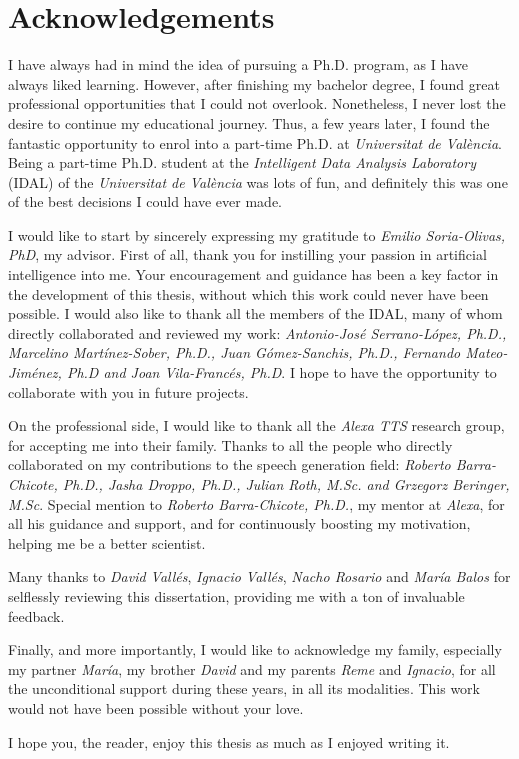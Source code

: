 \chapter*{Acknowledgements}

I have always had in mind the idea of pursuing a Ph.D. program, as I have always liked learning. However, after finishing my bachelor degree, I found great professional opportunities that I could not overlook. Nonetheless, I never lost the desire to continue my educational journey.  Thus, a  few years later, I found the fantastic opportunity to enrol into a part-time Ph.D. at \textit{Universitat de València}. Being a part-time Ph.D. student at the \textit{Intelligent Data Analysis Laboratory} (IDAL) of the \textit{Universitat de València} was lots of fun, and definitely this was one of the best decisions I could have ever made.  

I would like to start by sincerely expressing my gratitude to \textit{Emilio Soria-Olivas, PhD}, my advisor. First of all, thank you for instilling your passion in artificial intelligence into me. Your encouragement and guidance has been a key factor in the development of this thesis, without which this work could never have been possible. I would also like to thank all the members of the IDAL, many of whom directly collaborated and reviewed my work: \textit{Antonio-José Serrano-López, Ph.D., Marcelino  Martínez-Sober, Ph.D., Juan Gómez-Sanchis, Ph.D., Fernando Mateo-Jiménez, Ph.D and Joan Vila-Francés, Ph.D}. I hope to have the opportunity to collaborate with you in future projects.

On the professional side, I would like to thank all the \textit{Alexa TTS} research group, for accepting me into their family. Thanks to all the people who directly collaborated on my contributions to the speech generation field: \textit{Roberto Barra-Chicote, Ph.D., Jasha Droppo, Ph.D., Julian Roth, M.Sc. and Grzegorz Beringer, M.Sc}. Special mention to \textit{Roberto Barra-Chicote, Ph.D.}, my mentor at \textit{Alexa}, for all his guidance and support, and for continuously boosting my motivation, helping me be a better scientist.

Many thanks to \textit{David Vallés}, \textit{Ignacio Vallés}, \textit{Nacho Rosario} and \textit{María Balos} for selflessly reviewing this dissertation, providing me with a ton of invaluable feedback.

Finally, and more importantly, I would like to acknowledge my family, especially my partner \textit{María}, my brother \textit{David} and my parents \textit{Reme} and \textit{Ignacio}, for all the unconditional support during these years, in all its modalities. This work would not have been possible without your love.

I hope you, the reader, enjoy this thesis as much as I enjoyed writing it. 
\clearpage
